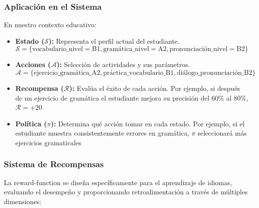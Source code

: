 

\subsubsection{Aplicación en el Sistema}

En nuestro contexto educativo:

\begin{itemize}
  \item \textbf{Estado ($\mathcal{S}$):} Representa el perfil actual del estudiante.
        \begin{equation}\label{eq:state}
          \mathcal{S} = \{\text{vocabulario\_nivel} = \text{B1}, \text{gramática\_nivel} = \text{A2}, \text{pronunciación\_nivel} = \text{B2}\}
        \end{equation}

  \item \textbf{Acciones ($\mathcal{A}$):} Selección de actividades y sus parámetros.
        \begin{equation}\label{eq:actions}
          \mathcal{A} = \{\text{ejercicio\_gramática\_A2}, \text{práctica\_vocabulario\_B1}, \text{diálogo\_pronunciación\_B2}\}
        \end{equation}

  \item \textbf{Recompensa ($\mathcal{R}$):} Evalúa el éxito de cada acción. Por ejemplo, si después de un ejercicio de gramática el estudiante mejora su precisión del 60\% al 80\%, $\mathcal{R} = +20$

  \item \textbf{Política ($\pi$):} Determina qué acción tomar en cada estado. Por ejemplo, si el estudiante muestra consistentemente errores en gramática, $\pi$ seleccionará más ejercicios gramaticales
\end{itemize}

\subsubsection{Sistema de Recompensas}

La \gls{reward-function} se diseña específicamente para el aprendizaje de idiomas, evaluando el desempeño y proporcionando retroalimentación a través de múltiples dimensiones:

